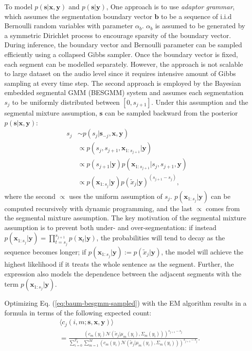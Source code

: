 \documentclass[journal]{IEEEtran}
\begin{document}
To model $p(\mathbf s|\mathbf x, \mathbf y)$ and $p(\mathbf s|\mathbf y)$, One approach 
 is to use \textit{adaptor grammar}\cite{Johnson2007, Lee2012}, which assumes the segmentation boundary vector $\mathbf{b}$ to be a sequence of i.i.d Bernoulli random variables with parameter $\alpha_b$. $\alpha_b$ is assumed to be generated by a symmetric Dirichlet process to encourage sparsity of the boundary vector. During inference, the boundary vector and Bernoulli parameter can be sampled efficiently using a collapsed Gibbs sampler.  Once the boundary vector is fixed, each segment can be modelled separately. However, the approach is not scalable to large dataset on the audio level since it requires intensive amount of Gibbs sampling at every time step. The second approach is employed by the Bayesian embedded segmental GMM (BESGMM) system \cite{Kamper2017} and assumes each segmentation $s_j$ to be uniformly distributed between $[0, s_{j+1}]$. Under this assumption and the segmental mixture assumption, $\mathbf s$ can be sampled backward from the posterior $p(\mathbf s|\mathbf x, \mathbf y)$:
 \begin{align*}
     s_j &\sim p(s_j|\mathbf s_{-j}, \mathbf x, \mathbf y)\\
     &\propto p(s_j, s_{j+1}, \mathbf x_{1:s_{j+1}}|\mathbf y)\\
     &\propto p(s_{j+1}|\mathbf y)p(\mathbf x_{1:s_{j+1}}|s_j, s_{j+1}, \mathbf y) \\
     &\propto p(\mathbf x_{1:s_{j}}|\mathbf y) p(\tilde{x}_j|\mathbf y)^{(s_{j+1}-s_j)},
 \end{align*}
 where the second $\propto$ uses the uniform assumption of $s_j$. $p(\mathbf x_{1:s_{j}}|\mathbf y)$ can be computed recursively with dynamic programming, and the last $\propto$ comes from the segmental mixture assumption. The key motivation of the segmental mixture assumption is to prevent both under- and over-segmentation: if instead $p(\mathbf x_{1:s_{j}}|\mathbf y) = \prod_{t=s_j}^{s_{j+1}}p(\mathbf x_t|\mathbf y)$, the probabilities will tend to decay as the sequence becomes longer; if $p(\mathbf x_{1:s_j}|\mathbf y) := p(\tilde x_j|\mathbf y)$, the model will achieve the highest likelihood if it treats the whole sentence as the segment. Further, the expression also models the dependence between the adjacent segments with the term $p(\mathbf x_{1:s_j}|\mathbf y)$. 
 
 Optimizing Eq. (\ref{eq:baum-besgmm-sampled}) with the EM algorithm results in a formula in terms of the following expected count:
 \begin{align}\label{eq:expected_counts_besgmm}
     &\langle c_j(i, m;\mathbf s, \mathbf x, \mathbf y)\rangle\\
     &= \frac{(c_{m}(y_{i})\mathcal N(\tilde{x}_j|\mu_{m}(y_{i}), \Sigma_{m}(y_{i})))^{s_{j+1}-s_j}}{\sum_{i=0}^{T_y}\sum_{m=1}^M (c_{m}(y_{i})\mathcal N(\tilde{x}_j|\mu_{m}(y_{i}), \Sigma_{m}(y_{i})))^{s_{j+1}-s_j}}.
 \end{align}
 
\end{document}
